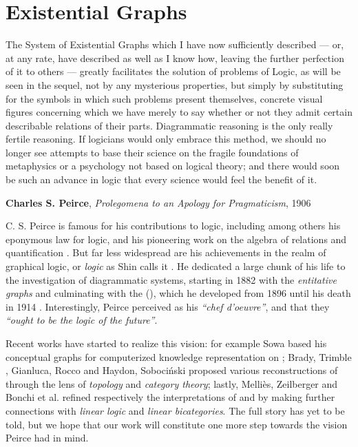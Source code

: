 \setchapterpreamble[u]{\margintoc}
\chapter{Existential Graphs}

\epigraph{The System of Existential Graphs which I have now sufficiently
described --- or, at any rate, have described as well as I know how, leaving the
further perfection of it to others --- greatly facilitates the solution of
problems of Logic, as will be seen in the sequel, not by any mysterious
properties, but simply by substituting for the symbols in which such problems
present themselves, concrete visual figures concerning which we have merely to
say whether or not they admit certain describable relations of their parts.
Diagrammatic reasoning is the only really fertile reasoning. If logicians would
only embrace this method, we should no longer see attempts to base their science
on the fragile foundations of metaphysics or a psychology not based on logical
theory; and there would soon be such an advance in logic that every science
would feel the benefit of it.}{\textbf{Charles S. Peirce}, \textit{Prolegomena
to an Apology for Pragmaticism}, 1906}


C. S. Peirce is famous for his contributions to  logic, including among
others his eponymous law for  logic, and his pioneering work on the
algebra of relations and quantification . But far
less widespread are his achievements in the realm of graphical logic, or
\emph{ logic} as Shin calls it .
He dedicated a large chunk of his life to the investigation of diagrammatic
systems, starting in 1882 with the \emph{entitative graphs} and culminating with
the  (), which he developed from 1896 until his
death in 1914 . Interestingly, Peirce perceived
 as his \textit{``chef d'oeuvre''}, and that they
\textit{``ought to be the logic of the future''}.

Recent works have started to realize this vision: for example Sowa based his
conceptual graphs for computerized knowledge representation on 
; Brady, Trimble
, Gianluca, Rocco
 and Haydon, Sobociński
 proposed various reconstructions of
 through the lens of \emph{topology} and \emph{category theory}; lastly,
Melliès, Zeilberger  and Bonchi et al.
 refined respectively the interpretations of
\cite{brady_string_nodate} and \cite{pietarinen_compositional_2020} by making
further connections with \emph{linear logic}  and
\emph{linear bicategories}. The full story has yet to be told, but we hope that
our work will constitute one more step towards the vision Peirce had in mind.

